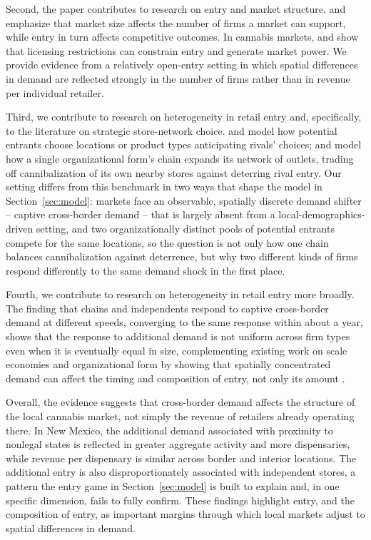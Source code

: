 \documentclass[english,12pt]{article}
\begin{document}
Second, the paper contributes to research on entry and market structure. \citet{BresnahanReiss1991} and \citet{BerryReiss2007} emphasize that market size affects the number of firms a market can support, while entry in turn affects competitive outcomes. In cannabis markets, \citet{Thomas2019} and \citet{HollenbeckUetake2021} show that licensing restrictions can constrain entry and generate market power. We provide evidence from a relatively open-entry setting in which spatial differences in demand are reflected strongly in the number of firms rather than in revenue per individual retailer.

Third, we contribute to research on heterogeneity in retail entry and, specifically, to the literature on strategic store-network choice. \citet{Seim2006} and \citet{Mazzeo2002} model how potential entrants choose locations or product types anticipating rivals' choices; \citet{Nishida2008} and \citet{Holmes2011} model how a single organizational form's chain expands its network of outlets, trading off cannibalization of its own nearby stores against deterring rival entry. Our setting differs from this benchmark in two ways that shape the model in Section~\ref{sec:model}: markets face an observable, spatially discrete demand shifter -- captive cross-border demand -- that is largely absent from a local-demographics-driven setting, and two organizationally distinct pools of potential entrants compete for the same locations, so the question is not only how one chain balances cannibalization against deterrence, but why two different kinds of firms respond differently to the same demand shock in the first place.

Fourth, we contribute to research on heterogeneity in retail entry more broadly. The finding that chains and independents respond to captive cross-border demand at different speeds, converging to the same response within about a year, shows that the response to additional demand is not uniform across firm types even when it is eventually equal in size, complementing existing work on scale economies and organizational form by showing that spatially concentrated demand can affect the timing and composition of entry, not only its amount \citep{Sadun2015}.

Overall, the evidence suggests that cross-border demand affects the structure of the local cannabis market, not simply the revenue of retailers already operating there. In New Mexico, the additional demand associated with proximity to nonlegal states is reflected in greater aggregate activity and more dispensaries, while revenue per dispensary is similar across border and interior locations. The additional entry is also disproportionately associated with independent stores, a pattern the entry game in Section~\ref{sec:model} is built to explain and, in one specific dimension, fails to fully confirm. These findings highlight entry, and the composition of entry, as important margins through which local markets adjust to spatial differences in demand.
\end{document}
